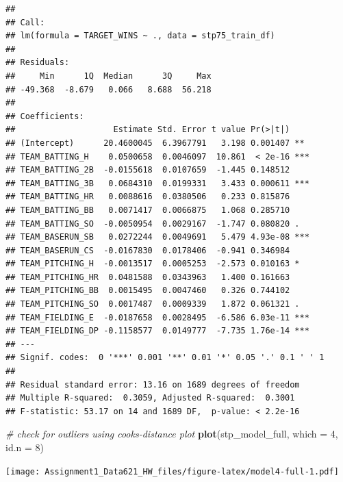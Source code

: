\documentclass[
]{article}
\newenvironment{Shaded}{\begin{snugshade}}{\end{snugshade}}
\newcommand{\AttributeTok}[1]{\textcolor[rgb]{0.13,0.29,0.53}{#1}}
\newcommand{\CommentTok}[1]{\textcolor[rgb]{0.56,0.35,0.01}{\textit{#1}}}
\newcommand{\DecValTok}[1]{\textcolor[rgb]{0.00,0.00,0.81}{#1}}
\newcommand{\FunctionTok}[1]{\textcolor[rgb]{0.13,0.29,0.53}{\textbf{#1}}}
\newcommand{\NormalTok}[1]{#1}
\newcommand{\OtherTok}[1]{\textcolor[rgb]{0.56,0.35,0.01}{#1}}
\newcommand{\SpecialCharTok}[1]{\textcolor[rgb]{0.81,0.36,0.00}{\textbf{#1}}}
\newcommand{\StringTok}[1]{\textcolor[rgb]{0.31,0.60,0.02}{#1}}
\begin{document}
\begin{verbatim}
## 
## Call:
## lm(formula = TARGET_WINS ~ ., data = stp75_train_df)
## 
## Residuals:
##     Min      1Q  Median      3Q     Max 
## -49.368  -8.679   0.066   8.688  56.218 
## 
## Coefficients:
##                    Estimate Std. Error t value Pr(>|t|)    
## (Intercept)      20.4600045  6.3967791   3.198 0.001407 ** 
## TEAM_BATTING_H    0.0500658  0.0046097  10.861  < 2e-16 ***
## TEAM_BATTING_2B  -0.0155618  0.0107659  -1.445 0.148512    
## TEAM_BATTING_3B   0.0684310  0.0199331   3.433 0.000611 ***
## TEAM_BATTING_HR   0.0088616  0.0380506   0.233 0.815876    
## TEAM_BATTING_BB   0.0071417  0.0066875   1.068 0.285710    
## TEAM_BATTING_SO  -0.0050954  0.0029167  -1.747 0.080820 .  
## TEAM_BASERUN_SB   0.0272244  0.0049691   5.479 4.93e-08 ***
## TEAM_BASERUN_CS  -0.0167830  0.0178406  -0.941 0.346984    
## TEAM_PITCHING_H  -0.0013517  0.0005253  -2.573 0.010163 *  
## TEAM_PITCHING_HR  0.0481588  0.0343963   1.400 0.161663    
## TEAM_PITCHING_BB  0.0015495  0.0047460   0.326 0.744102    
## TEAM_PITCHING_SO  0.0017487  0.0009339   1.872 0.061321 .  
## TEAM_FIELDING_E  -0.0187658  0.0028495  -6.586 6.03e-11 ***
## TEAM_FIELDING_DP -0.1158577  0.0149777  -7.735 1.76e-14 ***
## ---
## Signif. codes:  0 '***' 0.001 '**' 0.01 '*' 0.05 '.' 0.1 ' ' 1
## 
## Residual standard error: 13.16 on 1689 degrees of freedom
## Multiple R-squared:  0.3059, Adjusted R-squared:  0.3001 
## F-statistic: 53.17 on 14 and 1689 DF,  p-value: < 2.2e-16
\end{verbatim}

\begin{Shaded}
\begin{Highlighting}[]
\CommentTok{\# check for outliers using cooks{-}distance plot}
\FunctionTok{plot}\NormalTok{(stp\_model\_full, }\AttributeTok{which =} \DecValTok{4}\NormalTok{,  }\AttributeTok{id.n =} \DecValTok{8}\NormalTok{)}
\end{Highlighting}
\end{Shaded}

\texttt{[image: Assignment1\_Data621\_HW\_files/figure-latex/model4-full-1.pdf]}

\begin{Shaded}
\end{Shaded}
\end{document}
